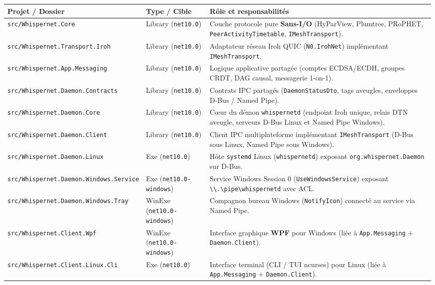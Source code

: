 \documentclass[11pt,a4paper]{article}
\begin{document}
\begin{table}[h!]
\centering
\small
\begin{tabular}{@{}llp{6.2cm}@{}}
\toprule
\textbf{Projet / Dossier} & \textbf{Type / Cible} & \textbf{Rôle et responsabilités} \\
\midrule
\texttt{src/Whispernet.Core} & Library (\texttt{net10.0}) & Couche protocole pure \textbf{Sans-I/O} (HyParView, Plumtree, PRoPHET, \texttt{PeerActivityTimetable}, \texttt{IMeshTransport}). \\
\texttt{src/Whispernet.Transport.Iroh} & Library (\texttt{net10.0}) & Adaptateur réseau Iroh QUIC (\texttt{N0.IrohNet}) implémentant \texttt{IMeshTransport}. \\
\texttt{src/Whispernet.App.Messaging} & Library (\texttt{net10.0}) & Logique applicative partagée (comptes ECDSA/ECDH, groupes CRDT, DAG causal, messagerie 1-on-1). \\
\texttt{src/Whispernet.Daemon.Contracts} & Library (\texttt{net10.0}) & Contrats IPC partagés (\texttt{DaemonStatusDto}, tags aveugles, enveloppes D-Bus / Named Pipe). \\
\texttt{src/Whispernet.Daemon.Core} & Library (\texttt{net10.0}) & Cœur du démon \texttt{whispernetd} (endpoint Iroh unique, relais DTN aveugle, serveurs D-Bus Linux et Named Pipe Windows). \\
\texttt{src/Whispernet.Daemon.Client} & Library (\texttt{net10.0}) & Client IPC multiplateforme implémentant \texttt{IMeshTransport} (D-Bus sous Linux, Named Pipe sous Windows). \\
\texttt{src/Whispernet.Daemon.Linux} & Exe (\texttt{net10.0}) & Hôte \texttt{systemd} Linux (\texttt{whispernetd}) exposant \texttt{org.whispernet.Daemon} sur D-Bus. \\
\texttt{src/Whispernet.Daemon.Windows.Service} & Exe (\texttt{net10.0-windows}) & Service Windows Session 0 (\texttt{UseWindowsService}) exposant \texttt{\textbackslash\textbackslash.\textbackslash pipe\textbackslash whispernetd} avec ACL. \\
\texttt{src/Whispernet.Daemon.Windows.Tray} & WinExe (\texttt{net10.0-windows}) & Compagnon bureau Windows (\texttt{NotifyIcon}) connecté au service via Named Pipe. \\
\texttt{src/Whispernet.Client.Wpf} & WinExe (\texttt{net10.0-windows}) & Interface graphique \textbf{WPF} pour Windows (liée à \texttt{App.Messaging} + \texttt{Daemon.Client}). \\
\texttt{src/Whispernet.Client.Linux.Cli} & Exe (\texttt{net10.0}) & Interface terminal (CLI / TUI ncurses) pour Linux (liée à \texttt{App.Messaging} + \texttt{Daemon.Client}). \\

\end{tabular}
\end{table}
\end{document}
